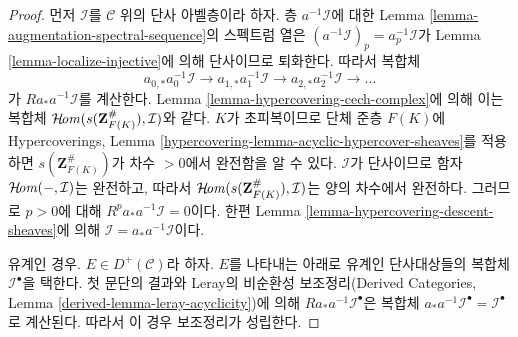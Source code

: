 \begin{proof}
먼저 $\mathcal{I}$를 $\mathcal{C}$ 위의 단사 아벨층이라 하자.
층 $a^{-1}\mathcal{I}$에 대한 Lemma
\ref{lemma-augmentation-spectral-sequence}의 스펙트럼 열은
$(a^{-1}\mathcal{I})_p = a_p^{-1}\mathcal{I}$가
Lemma \ref{lemma-localize-injective}에 의해 단사이므로 퇴화한다.
따라서 복합체
$$
a_{0, *}a_0^{-1}\mathcal{I} \to
a_{1, *}a_1^{-1}\mathcal{I} \to
a_{2, *}a_2^{-1}\mathcal{I} \to\ldots
$$
가 $Ra_*a^{-1}\mathcal{I}$를 계산한다.
Lemma \ref{lemma-hypercovering-cech-complex}에 의해 이는 복합체
$\mathop{\mathcal{H}\!\mathit{om}}\nolimits(s(\mathbf{Z}_{F(K)}^\#), \mathcal{I})$와 같다.
$K$가 초피복이므로 단체 준층 $F(K)$에 Hypercoverings, Lemma
\ref{hypercovering-lemma-acyclic-hypercover-sheaves}를 적용하면
$s(\mathbf{Z}_{F(K)}^\#)$가 차수 $> 0$에서 완전함을 알 수 있다.
$\mathcal{I}$가 단사이므로 함자 $\mathop{\mathcal{H}\!\mathit{om}}\nolimits(-, \mathcal{I})$는 완전하고,
따라서 $\mathop{\mathcal{H}\!\mathit{om}}\nolimits(s(\mathbf{Z}_{F(K)}^\#), \mathcal{I})$는 양의
차수에서 완전하다. 그러므로 $p > 0$에 대해
$R^pa_*a^{-1}\mathcal{I} = 0$이다. 한편 Lemma
\ref{lemma-hypercovering-descent-sheaves}에 의해
$\mathcal{I} = a_*a^{-1}\mathcal{I}$이다.

\medskip\noindent
유계인 경우. $E \in D^+(\mathcal{C})$라 하자. $E$를 나타내는 아래로
유계인 단사대상들의 복합체 $\mathcal{I}^\bullet$을 택한다. 첫 문단의
결과와 Leray의 비순환성 보조정리(Derived Categories, Lemma
\ref{derived-lemma-leray-acyclicity})에 의해
$Ra_*a^{-1}\mathcal{I}^\bullet$은 복합체
$a_*a^{-1}\mathcal{I}^\bullet = \mathcal{I}^\bullet$로 계산된다.
따라서 이 경우 보조정리가 성립한다.


\end{proof}
